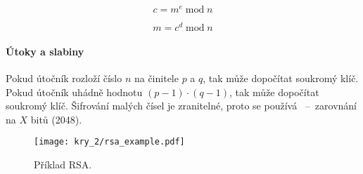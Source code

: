 \begin{equation}
    c = m^e \; \text{mod} \; n
\end{equation}

\begin{equation}
    m = c^d \; \text{mod} \; n
\end{equation}

\paragraph*{Útoky a slabiny} Pokud útočník rozloží číslo $n$ na činitele $p$ a $q$, tak může dopočítat soukromý klíč. Pokud útočník uhádně hodnotu $(p-1) \cdot (q-1)$, tak může dopočítat soukromý klíč. Šifrování malých čísel je zranitelné, proto se používá ~--~zarovnání na $X$ bitů (2048).

\begin{figure}[H]
    \centering
    \texttt{[image: kry\_2/rsa\_example.pdf]}
    \caption{Příklad RSA.}
\end{figure}

